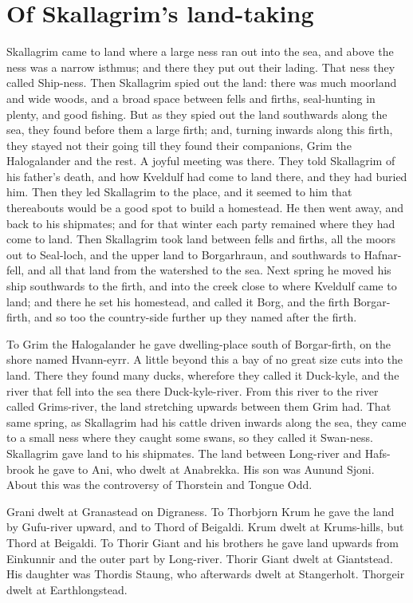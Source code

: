 \chapter{Of Skallagrim's land-taking}
Skallagrim came to land where a large ness ran out into the sea, and above the ness was a narrow isthmus; and there they put out their lading. That ness they called Ship-ness. Then Skallagrim spied out the land: there was much moorland and wide woods, and a broad space between fells and firths, seal-hunting in plenty, and good fishing. But as they spied out the land southwards along the sea, they found before them a large firth; and, turning inwards along this firth, they stayed not their going till they found their companions, Grim the Halogalander and the rest. A joyful meeting was there. They told Skallagrim of his father's death, and how Kveldulf had come to land there, and they had buried him. Then they led Skallagrim to the place, and it seemed to him that thereabouts would be a good spot to build a homestead. He then went away, and back to his shipmates; and for that winter each party remained where they had come to land. Then Skallagrim took land between fells and firths, all the moors out to Seal-loch, and the upper land to Borgarhraun, and southwards to Hafnar-fell, and all that land from the watershed to the sea. Next spring he moved his ship southwards to the firth, and into the creek close to where Kveldulf came to land; and there he set his homestead, and called it Borg, and the firth Borgar-firth, and so too the country-side further up they named after the firth.

To Grim the Halogalander he gave dwelling-place south of Borgar-firth, on the shore named Hvann-eyrr. A little beyond this a bay of no great size cuts into the land. There they found many ducks, wherefore they called it Duck-kyle, and the river that fell into the sea there Duck-kyle-river. From this river to the river called Grims-river, the land stretching upwards between them Grim had. That same spring, as Skallagrim had his cattle driven inwards along the sea, they came to a small ness where they caught some swans, so they called it Swan-ness. Skallagrim gave land to his shipmates. The land between Long-river and Hafs-brook he gave to Ani, who dwelt at Anabrekka. His son was Aunund Sjoni. About this was the controversy of Thorstein and Tongue Odd.

Grani dwelt at Granastead on Digraness. To Thorbjorn Krum he gave the land by Gufu-river upward, and to Thord of Beigaldi. Krum dwelt at Krums-hills, but Thord at Beigaldi. To Thorir Giant and his brothers he gave land upwards from Einkunnir and the outer part by Long-river. Thorir Giant dwelt at Giantstead. His daughter was Thordis Staung, who afterwards dwelt at Stangerholt. Thorgeir dwelt at Earthlongstead.

